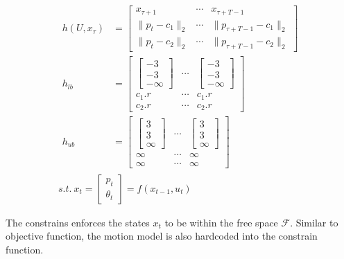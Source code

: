 \documentclass[conference]{IEEEtran}
\begin{document}
\[
\begin{gathered}
\begin{aligned}
h(U, x_\tau)&=\left[ \begin{matrix}x_{\tau +1}&\cdots &x_{\tau +T-1}\\ \| p_{t}-c_{1}\|_{2} &\cdots &\| p_{\tau +T-1}-c_{1}\|_{2} \\ \| p_{t}-c_{2}\|_{2} &\cdots &\| p_{\tau +T-1}-c_{2}\|_2 \end{matrix}  \right] \\ 
h_{lb}&=\left[ \begin{matrix}\left[ \begin{gathered}-3\\ -3\\ -\infty \end{gathered}  \right] &\cdots &\left[ \begin{gathered}-3\\ -3\\ -\infty \end{gathered}  \right] \\ c_{1}.r&\cdots &c_{1}.r\\ c_{2}.r&\cdots &c_{2}.r\end{matrix}  \right] \\ 
h_{ub}&=\left[ \begin{matrix}\left[ \begin{gathered} 3\\  3\\  \infty \end{gathered}  \right] &\cdots &\left[ \begin{gathered} 3\\  3\\  \infty \end{gathered}  \right] \\ \infty&\cdots &\infty\\ \infty&\cdots &\infty\end{matrix}  \right] 
\end{aligned} \\
s.t. \ x_{t} = \left[ \begin{gathered}p_{t}\\ \theta_{t} \end{gathered}  \right]  =f(x_{t-1},u_{t}) 
\end{gathered}
\]

The constrains enforces the states $x_t$ to be within the free space $\mathcal{F}$.
Similar to objective function, the motion model is also hardcoded into the constrain function.
\end{document}
